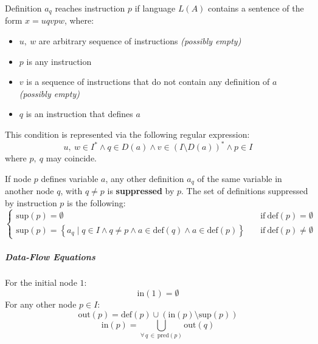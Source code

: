\documentclass[english]{article}
\begin{document}
\begin{definition}
  \label{def:reaching-definition-regular-expression}
  Definition \(a_q\) reaches instruction \(p\) if language \(L(A)\) contains a sentence of the form \(x = u q v p w\), where:
  \begin{itemize}
    \item \(u, \ w\) are arbitrary sequence of instructions \textit{(possibly empty)}
    \item \(p\) is any instruction
    \item \(v\) is a sequence of instructions that do not contain any definition of \(a\) \textit{(possibly empty)}
    \item \(q\) is an instruction that defines \(a\)
  \end{itemize}

  This condition is represented via the following regular expression:
  \[ u, \ w \in I^\ast \land q \in D\left( a \right) \land v \in \left( I \setminus D \left( a \right)\right)^\ast \land p \in I \]
  where \(p, \ q\) may coincide.
\end{definition}

\begin{definition}
  \label{def:reaching-definition-data-flow-equations}
  If node \(p\) defines variable \(a\), any other definition \(a_q\) of the same variable in another node \(q\), with \(q \neq p\) is \textbf{suppressed} by \(p\).
  The set of definitions suppressed by instruction \(p\) is the following:
  \[\begin{cases}
      \text{sup}(p) = \emptyset \quad                                                                                             & \text{if} \ \text{def}(p) = \emptyset    \\
      \text{sup}(p) = \left\{ a_q \mid q \in I \land q \neq p \land a \in \text{def} (q) \land a \in \text{def}(p) \right\} \quad & \text{if} \ \text{def}(p) \neq \emptyset
    \end{cases}\]
\end{definition}

\subparagraph*{Data-Flow Equations}

For the initial node \(1\):
\[
  \label{eq:reaching-definition-data-flow-equations-1}\tag{A}\text{in}(1) = \emptyset
\]
For any other node \(p \in I\):
\[
  \label{eq:reaching-definition-data-flow-equations-2}\tag{B}\text{out}(p) = \text{def}(p) \cup \left( \text{in}(p) \setminus \text{sup}(p) \right)
\]
\[
  \label{eq:reaching-definition-data-flow-equations-3}\tag{C}\text{in}(p) = \bigcup_{\forall \, q \, \in \, \text{pred}(p)} \text{out}(q)
\]
\end{document}
